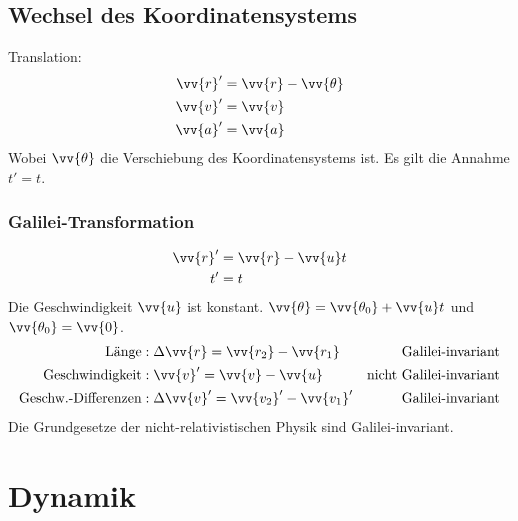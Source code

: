 \documentclass[a4paper,12pt]{article}
\numberwithin{equation}{section}
\begin{document}
\subsection{Wechsel des Koordinatensystems}
Translation: \begin{align*}
        \vv{r}'&=\vv{r}-\vv{\theta}\\
        \vv{v}'&=\vv{v}\\
        \vv{a}'&=\vv{a}
\end{align*}
Wobei $\vv{\theta}$ die Verschiebung des Koordinatensystems ist. Es gilt die Annahme $t'=t$.

\subsubsection{Galilei-Transformation}
\begin{align*}
        \vv{r}'&=\vv{r}-\vv{u}t\\
        t'&=t
\end{align*}
Die Geschwindigkeit $\vv{u}$ ist konstant. $\vv{\theta }=\vv{\theta _0}+\vv{u}t$ und $\vv{\theta _0}=\vv{0}$.
\begin{align*}
        \text{Länge}&:\Delta \vv{r}=\vv{r_2}-\vv{r_1} &\text{Galilei-invariant}\\
        \text{Geschwindigkeit}&:\vv{v}'=\vv{v}-\vv{u}&\text{nicht Galilei-invariant}\\
        \text{Geschw.-Differenzen}&:\Delta \vv{v}'=\vv{v_2}'-\vv{v_1}'&\text{Galilei-invariant}
\end{align*}
Die Grundgesetze der nicht-relativistischen Physik sind Galilei-invariant.

\section{Dynamik}
\end{document}
